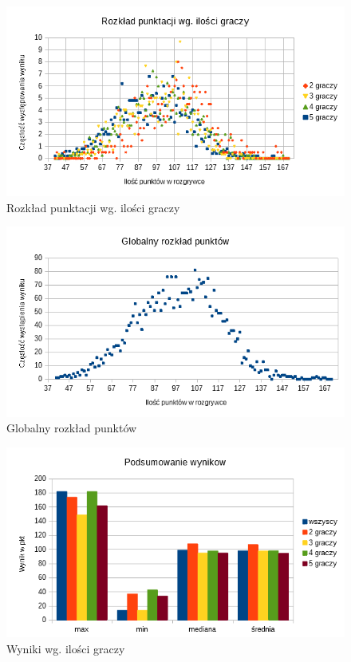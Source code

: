 \documentclass[12pt, oneside]{report}
\begin{document}
\begin{figure}
	\includegraphics{Wykrespunktow.png}
	\caption{Rozkład punktacji wg. ilości graczy}
	\label{figure:player_points_algo}
\end{figure}

\begin{figure}
	\includegraphics{Wykrespunktowglobal.png}
	\caption{Globalny rozkład punktów}
	\label{figure:global_points_algo}
\end{figure}

\begin{figure}
	\includegraphics{WynikWPkt.png}
	\caption{Wyniki wg. ilości graczy}
	\label{figure:min_max_algo}
\end{figure}
\end{document}
